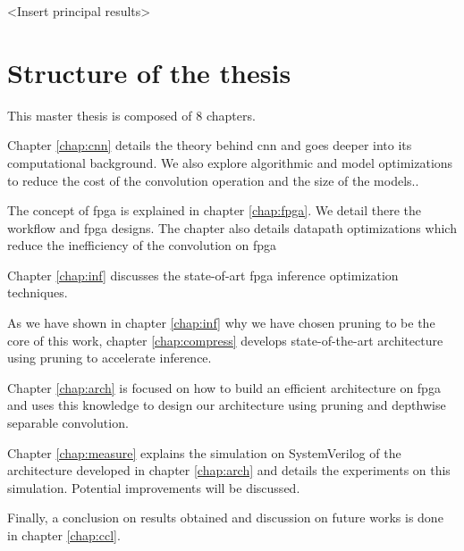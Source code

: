 <Insert principal results>
%
%
\section*{Structure of the thesis}
%
%
This master thesis is composed of 8 chapters.

Chapter \ref{chap:cnn} details the theory behind \acrshort{cnn} and goes deeper into its computational background. We also explore algorithmic and model optimizations to reduce the cost of the convolution operation and the size of the models..

The concept of \acrshort{fpga} is explained in chapter \ref{chap:fpga}. We detail there the workflow and \acrshort{fpga} designs. The chapter also details datapath optimizations which reduce the inefficiency of the convolution on \acrshort{fpga}

Chapter \ref{chap:inf} discusses the state-of-art \acrshort{fpga} inference optimization techniques.

As we have shown in chapter \ref{chap:inf} why we have chosen pruning to be the core of this work, chapter \ref{chap:compress} develops state-of-the-art architecture using pruning to accelerate inference.

Chapter \ref{chap:arch} is focused on how to build an efficient architecture on \acrshort{fpga} and uses this knowledge to design our architecture using pruning and depthwise separable convolution.

Chapter \ref{chap:measure} explains the simulation on SystemVerilog of the architecture developed in chapter \ref{chap:arch} and details the experiments on this simulation. Potential improvements will be discussed.

Finally, a conclusion on results obtained and discussion on future works is done in chapter \ref{chap:ccl}.

\afterpage{\blankpage}
\cleardoublepage
\newpage
